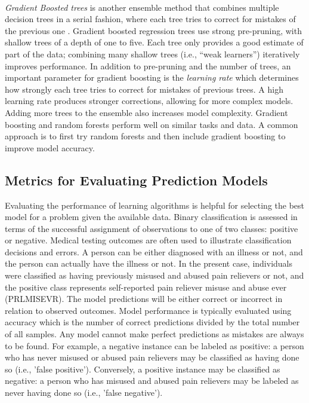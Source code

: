 \\\documentclass[sigconf]{acmart}
\begin{document}

\emph{Gradient Boosted trees} is another ensemble method that combines 
multiple decision trees in a serial fashion, where each tree tries to correct 
for mistakes of the previous one \cite{muller17}. Gradient boosted regression 
trees use strong pre-pruning, with shallow trees of a depth of one to five. 
Each tree only provides a good estimate of part of the data; combining many 
shallow trees (i.e., ``weak learners'') iteratively improves performance. 
In addition to pre-pruning and the number of trees, an important parameter 
for gradient boosting is the \emph{learning rate} which determines how strongly 
each tree tries to correct for mistakes of previous trees. A high learning rate
produces stronger corrections, allowing for more complex models. Adding more 
trees to the ensemble also increases model complexity. Gradient boosting
and random forests perform well on similar tasks and data. A common 
approach is to first try random forests and then include gradient boosting 
to improve model accuracy. 


\subsection{Metrics for Evaluating Prediction Models}

Evaluating the performance of learning algorithms is helpful for selecting 
the best model for a problem given the available data. Binary classification 
is assessed in terms of the successful assignment of observations to one of 
two classes: positive or negative. Medical testing outcomes are often used to 
illustrate classification decisions and errors. A person can be either 
diagnosed with an illness or not, and the person can actually have the 
illness or not. In the present case, individuals were classified as having 
previously misused and abused pain relievers or not, and the positive class
represents self-reported pain reliever misuse and abuse ever (PRLMISEVR).
The model predictions will be either correct or incorrect in relation to
observed outcomes. Model performance is typically evaluated using accuracy 
which is the number of correct predictions divided by the total number of 
all samples. Any model cannot make perfect predictions as mistakes are 
always to be found. For example, a negative instance can be labeled 
as positive: a person who has never misused or abused pain relievers may be 
classified as having done so (i.e., 'false positive'). Conversely, a positive 
instance may be classified as negative: a person who has misused and abused 
pain relievers may be labeled as never having done so (i.e., 'false negative').
\end{document}
